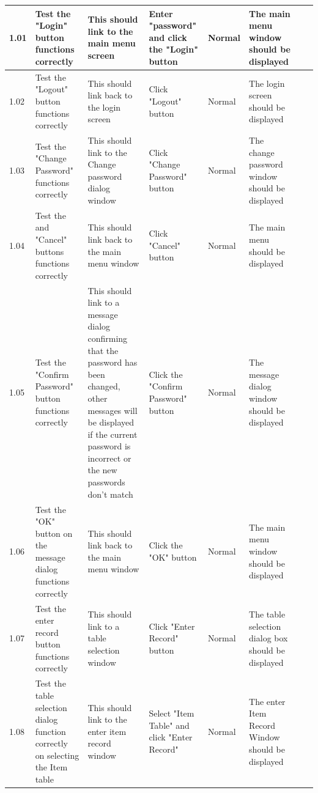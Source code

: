 \begin{landscape}
\begin{center}
\begin{longtable}{|p{1.5cm}|p{2cm}|p{3cm}|p{2cm}|p{2cm}|p{2.5cm}|p{2cm}|p{2cm}|}
        1.01 & Test the "Login" button functions correctly & This should link to the main menu screen & Enter "password" and click the "Login" button & Normal & The 
        main menu window should be displayed  & & \\ \hline
        
        1.02 & Test the "Logout" button functions correctly & This should link back to the login screen & Click "Logout" button & Normal & The login screen should 
        be displayed & & \\ \hline
        
        1.03 & Test the "Change Password" functions correctly & This should link to the Change password dialog window & Click "Change Password" button & Normal & The 
        change password window should be displayed & & \\ \hline
        
        1.04 & Test the and "Cancel" buttons functions correctly & This should link back to the main menu window & Click "Cancel" button & Normal & The main menu should 
        be displayed & & \\ \hline
        
        1.05 & Test the "Confirm Password" button functions correctly & This should link to a message dialog confirming that the password has been changed, other 
        messages will be displayed if the current password is incorrect or the new passwords don't match & Click the "Confirm Password" button & Normal & The message 
        dialog window should be displayed & & \\ \hline
        
        1.06 & Test the "OK" button on the message dialog functions correctly & This should link back to the main menu window & Click the "OK" button & Normal & The 
        main menu window should be displayed & & \\ \hline
        
        1.07 & Test the enter record button functions correctly & This should link to a table selection window & Click "Enter Record" button & Normal & The table
        selection dialog box should be displayed & & \\ \hline 
        
        1.08 & Test the table selection dialog function correctly on selecting the Item table & This should link to the enter item record window & Select "Item Table" 
        and click "Enter Record" & Normal & The enter Item Record Window should be displayed & & \\ \hline
        

\end{longtable}
\end{center}
\end{landscape}
